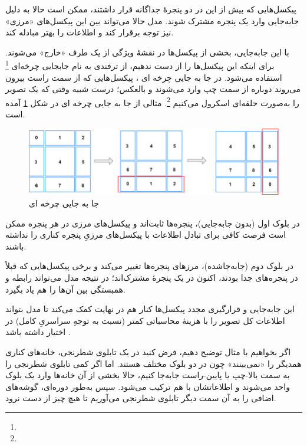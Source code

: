 پیکسل‌هایی که پیش از این در دو پنجرهٔ جداگانه قرار داشتند، ممکن است حالا به دلیل جابه‌جایی وارد یک پنجره مشترک شوند.
مدل حالا می‌تواند بین این پیکسل‌های «مرزی» نیز  توجه برقرار کند و اطلاعات را بهتر مبادله کند.


با این جابه‌جایی، بخشی از پیکسل‌ها در نقشهٔ ویژگی از یک طرف «خارج» می‌شوند. برای اینکه این پیکسل‌ها را از دست ندهیم، از ترفندی به نام  جابجایی چرخه‌ای \footnote{} استفاده می‌شود. در جا به جایی چرخه ای ، پیکسل‌هایی که از سمت راست بیرون می‌روند دوباره از سمت چپ وارد می‌شوند و بالعکس؛ درست شبیه وقتی که یک تصویر را به‌صورت حلقه‌ای اسکرول می‌کنیم \footnote{}. مثالی از جا به جایی چرخه ای  در شکل \ref{fig:Cycle Shift in Swin Tranformer} آمده است.

\begin{figure}[h]
	\centering
	\begin{minipage}[b]{1\textwidth}
		\centering
		\includegraphics[width=\textwidth]{transformer_images/cycle_shift.png}
		\caption{جا به جایی چرخه ای}
		\label{fig:Cycle Shift in Swin Tranformer}
	\end{minipage}
	\hfill
\end{figure}

در بلوک اول (بدون جابه‌جایی)، پنجره‌ها ثابت‌اند و پیکسل‌های مرزی در هر پنجره ممکن است فرصت کافی برای تبادل اطلاعات با پیکسل‌های مرزیِ پنجره کناری را نداشته باشند.

در بلوک دوم (جابه‌جاشده)، مرزهای پنجره‌ها تغییر می‌کند و برخی پیکسل‌هایی که قبلاً در پنجره‌های جدا بودند، اکنون در یک پنجرهٔ مشترک‌اند؛ در نتیجه مدل می‌تواند رابطه و همبستگی بین آن‌ها را هم یاد بگیرد.

این جابه‌جایی و قرارگیری مجدد پیکسل‌ها کنار هم در نهایت کمک می‌کند تا مدل بتواند اطلاعات کل تصویر را با هزینهٔ محاسباتی کمتر (نسبت به توجهِ سراسریِ کامل) در اختیار داشته باشد \cite{liu2021swintransformer}.

اگر بخواهیم با مثال توضیح دهیم، فرض کنید در یک تابلوی شطرنجی، خانه‌های کناری همدیگر را «نمی‌بینند» چون در دو بلوک مختلف هستند.
اما اگر کمی تابلوی شطرنجی را به سمت بالا-چپ یا پایین-راست جابه‌جا کنیم،
حالا بخشی از آن خانه‌ها وارد یک بلوک واحد می‌شوند و اطلاعاتشان با هم ترکیب می‌شود.
سپس به‌طور دوره‌ای، گوشه‌های اضافی را به آن سمت دیگر تابلوی شطرنجی می‌آوریم
تا هیچ چیز از دست نرود.

